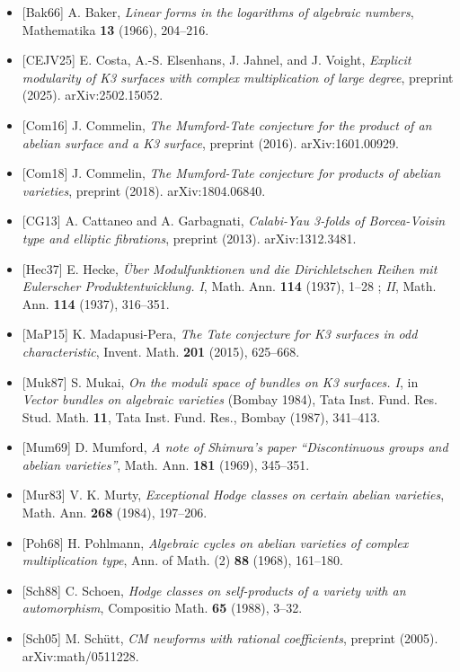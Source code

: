 \documentclass[
  11pt,
  a4paper,
]{amsart}
\providecommand{\tightlist}{\setlength{\itemsep}{0pt}\setlength{\parskip}{0pt}}
\providecommand{\tightlist}{%
  \setlength{\itemsep}{0pt}\setlength{\parskip}{0pt}}
\begin{document}
\begin{itemize}
\tightlist
\item
  {[}Bak66{]} A. Baker, \emph{Linear forms in the logarithms of algebraic numbers}, Mathematika \textbf{13} (1966), 204--216.
\item
  {[}CEJV25{]} E. Costa, A.-S. Elsenhans, J. Jahnel, and J. Voight, \emph{Explicit modularity of K3 surfaces with complex multiplication of large degree}, preprint (2025). arXiv:2502.15052.
\item
  {[}Com16{]} J. Commelin, \emph{The Mumford-Tate conjecture for the product of an abelian surface and a K3 surface}, preprint (2016). arXiv:1601.00929.
\item
  {[}Com18{]} J. Commelin, \emph{The Mumford-Tate conjecture for products of abelian varieties}, preprint (2018). arXiv:1804.06840.
\item
  {[}CG13{]} A. Cattaneo and A. Garbagnati, \emph{Calabi-Yau 3-folds of Borcea-Voisin type and elliptic fibrations}, preprint (2013). arXiv:1312.3481.
\item
  {[}Hec37{]} E. Hecke, \emph{Über Modulfunktionen und die Dirichletschen Reihen mit Eulerscher Produktentwicklung. I}, Math. Ann. \textbf{114} (1937), 1--28 ; \emph{II}, Math. Ann. \textbf{114} (1937), 316--351.
\item
  {[}MaP15{]} K. Madapusi-Pera, \emph{The Tate conjecture for K3 surfaces in odd characteristic}, Invent. Math. \textbf{201} (2015), 625--668.
\item
  {[}Muk87{]} S. Mukai, \emph{On the moduli space of bundles on K3 surfaces. I}, in \emph{Vector bundles on algebraic varieties} (Bombay 1984), Tata Inst. Fund. Res. Stud. Math. \textbf{11}, Tata Inst. Fund. Res., Bombay (1987), 341--413.
\item
  {[}Mum69{]} D. Mumford, \emph{A note of Shimura's paper ``Discontinuous groups and abelian varieties''}, Math. Ann. \textbf{181} (1969), 345--351.
\item
  {[}Mur83{]} V. K. Murty, \emph{Exceptional Hodge classes on certain abelian varieties}, Math. Ann. \textbf{268} (1984), 197--206.
\item
  {[}Poh68{]} H. Pohlmann, \emph{Algebraic cycles on abelian varieties of complex multiplication type}, Ann. of Math. (2) \textbf{88} (1968), 161--180.
\item
  {[}Sch88{]} C. Schoen, \emph{Hodge classes on self-products of a variety with an automorphism}, Compositio Math. \textbf{65} (1988), 3--32.
\item
  {[}Sch05{]} M. Schütt, \emph{CM newforms with rational coefficients}, preprint (2005). arXiv:math/0511228.

\end{itemize}
\end{document}

